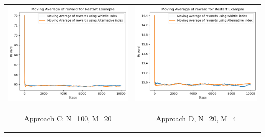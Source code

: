 \documentclass{slides}
\begin{document}
{{\begin{center}
\begin{tabular}{cc}
\includegraphics[scale=0.6]{homo_restart_comparison_C.png} &
\includegraphics[scale=0.6]{comparison_homo_restart_D_new.png} \\
\begin{small}
 Approach C: N=100, M=20\end{small} & \begin{small}Approach D, N=20, M=4\end{small}\\
 \end{tabular}

\end{center}
    
}}
\end{document}
